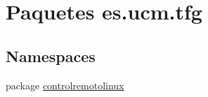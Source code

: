 \hypertarget{namespacees_1_1ucm_1_1tfg}{\section{Paquetes es.\-ucm.\-tfg}
\label{namespacees_1_1ucm_1_1tfg}
}
\subsection*{Namespaces}
\begin{DoxyCompactItemize}
\item 
package \hyperlink{namespacees_1_1ucm_1_1tfg_1_1controlremotolinux}{controlremotolinux}
\end{DoxyCompactItemize}
